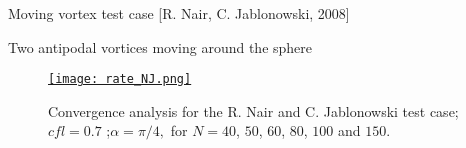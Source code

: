 \documentclass[11pt]{beamer}
\begin{document}
\begin{frame}{Moving vortex test case [R. Nair, C. Jablonowski, 2008]}
\begin{block}{Two antipodal vortices moving around the sphere}
\begin{figure}
\href{run:ref_7363145849_test_2.avi}{\texttt{[image: rate\_NJ.png]}} 
\caption{Convergence analysis for the R. Nair and C. Jablonowski test case; $cfl = 0.7$ ;$\alpha = \pi/4,$ for $N = 40$, $50$, $60$, $80$, $100$ and $150$.}
\end{figure}
\end{block}
\end{frame}



\end{document}
